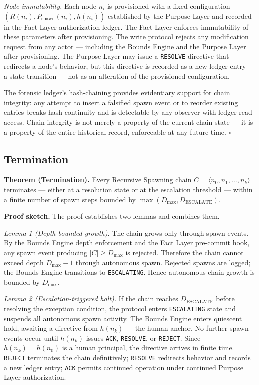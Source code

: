 \medskip
\textit{Node immutability.} Each node $n_i$ is provisioned with a fixed configuration $(R(n_i), P_{\mathrm{spawn}}(n_i), h(n_i))$ established by the Purpose Layer and recorded in the Fact Layer authorization ledger. The Fact Layer enforces immutability of these parameters after provisioning. The write protocol rejects any modification request from any actor — including the Bounds Engine and the Purpose Layer after provisioning. The Purpose Layer may issue a \texttt{RESOLVE} directive that redirects a node's behavior, but this directive is recorded as a new ledger entry — a state transition — not as an alteration of the provisioned configuration.

The forensic ledger's hash-chaining provides evidentiary support for chain integrity: any attempt to insert a falsified spawn event or to reorder existing entries breaks hash continuity and is detectable by any observer with ledger read access. Chain integrity is not merely a property of the current chain state — it is a property of the entire historical record, enforceable at any future time. $\square$

\subsection{Termination}
\label{sec:rs-termination}

\medskip
\noindent\textbf{Theorem (Termination).} Every Recursive Spawning chain $C = \langle n_0, n_1, \ldots, n_k \rangle$ terminates — either at a resolution state or at the escalation threshold — within a finite number of spawn steps bounded by $\max(D_{\mathrm{max}}, D_{\mathrm{ESCALATE}})$.

\medskip
\noindent\textbf{Proof sketch.} The proof establishes two lemmas and combines them.

\medskip
\textit{Lemma 1 (Depth-bounded growth).} The chain grows only through spawn events. By the Bounds Engine depth enforcement and the Fact Layer pre-commit hook, any spawn event producing $|C| \geq D_{\mathrm{max}}$ is rejected. Therefore the chain cannot exceed depth $D_{\mathrm{max}} - 1$ through autonomous spawn. Rejected spawns are logged; the Bounds Engine transitions to \texttt{ESCALATING}. Hence autonomous chain growth is bounded by $D_{\mathrm{max}}$.

\medskip
\textit{Lemma 2 (Escalation-triggered halt).} If the chain reaches $D_{\mathrm{ESCALATE}}$ before resolving the exception condition, the protocol enters \texttt{ESCALATING} state and suspends all autonomous spawn activity. The Bounds Engine enters quiescent hold, awaiting a directive from $h(n_k)$ — the human anchor. No further spawn events occur until $h(n_k)$ issues \texttt{ACK}, \texttt{RESOLVE}, or \texttt{REJECT}. Since $h(n_k) = h(n_0)$ is a human principal, the directive arrives in finite time. \texttt{REJECT} terminates the chain definitively; \texttt{RESOLVE} redirects behavior and records a new ledger entry; \texttt{ACK} permits continued operation under continued Purpose Layer authorization.

